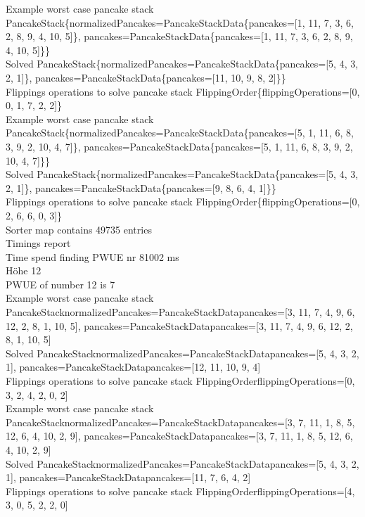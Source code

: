 Example worst case pancake stack PancakeStack\{normalizedPancakes=PancakeStackData\{pancakes=[1, 11, 7, 3, 6, 2, 8, 9, 4, 10, 5]\}, pancakes=PancakeStackData\{pancakes=[1, 11, 7, 3, 6, 2, 8, 9, 4, 10, 5]\}\} \\
Solved PancakeStack\{normalizedPancakes=PancakeStackData\{pancakes=[5, 4, 3, 2, 1]\}, pancakes=PancakeStackData\{pancakes=[11, 10, 9, 8, 2]\}\} \\
Flippings operations to solve pancake stack FlippingOrder\{flippingOperations=[0, 0, 1, 7, 2, 2]\} \\
Example worst case pancake stack PancakeStack\{normalizedPancakes=PancakeStackData\{pancakes=[5, 1, 11, 6, 8, 3, 9, 2, 10, 4, 7]\}, pancakes=PancakeStackData\{pancakes=[5, 1, 11, 6, 8, 3, 9, 2, 10, 4, 7]\}\} \\
Solved PancakeStack\{normalizedPancakes=PancakeStackData\{pancakes=[5, 4, 3, 2, 1]\}, pancakes=PancakeStackData\{pancakes=[9, 8, 6, 4, 1]\}\} \\
Flippings operations to solve pancake stack FlippingOrder\{flippingOperations=[0, 2, 6, 6, 0, 3]\} \\
Sorter map contains 49735 entries \\
Timings report \\
Time spend finding PWUE nr 81002 ms \\
Höhe 12 \\
PWUE of number 12 is 7 \\
Example worst case pancake stack PancakeStack{normalizedPancakes=PancakeStackData{pancakes=[3, 11, 7, 4, 9, 6, 12, 2, 8, 1, 10, 5]}, pancakes=PancakeStackData{pancakes=[3, 11, 7, 4, 9, 6, 12, 2, 8, 1, 10, 5]}} \\
Solved PancakeStack{normalizedPancakes=PancakeStackData{pancakes=[5, 4, 3, 2, 1]}, pancakes=PancakeStackData{pancakes=[12, 11, 10, 9, 4]}} \\
Flippings operations to solve pancake stack FlippingOrder{flippingOperations=[0, 3, 2, 4, 2, 0, 2]} \\
Example worst case pancake stack PancakeStack{normalizedPancakes=PancakeStackData{pancakes=[3, 7, 11, 1, 8, 5, 12, 6, 4, 10, 2, 9]}, pancakes=PancakeStackData{pancakes=[3, 7, 11, 1, 8, 5, 12, 6, 4, 10, 2, 9]}} \\
Solved PancakeStack{normalizedPancakes=PancakeStackData{pancakes=[5, 4, 3, 2, 1]}, pancakes=PancakeStackData{pancakes=[11, 7, 6, 4, 2]}} \\
Flippings operations to solve pancake stack FlippingOrder{flippingOperations=[4, 3, 0, 5, 2, 2, 0]} \\
